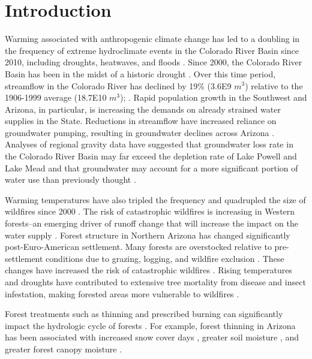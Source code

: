 \documentclass[
  number,
  preprint,
  3p,
  onecolumn]{elsarticle}
\begin{document}
\section{Introduction}\label{introduction}

Warming associated with anthropogenic climate change has led to a
doubling in the frequency of extreme hydroclimate events in the Colorado
River Basin since 2010, including droughts, heatwaves, and floods
\citep{bennett_concurrent_2021}. Since 2000, the Colorado River Basin
has been in the midst of a historic drought
\citep{meko_treering_2022, williams_rapid_2022}. Over this time period,
streamflow in the Colorado River has declined by 19\% (3.6E9 \(m^3\))
relative to the 1906-1999 average (18.7E10 \(m^3\));
\citep{hogan_recent_2024, udall_twentyfirst_2017}. Rapid population
growth in the Southwest and Arizona, in particular, is increasing the
demands on already strained water supplies in the State. Reductions in
streamflow have increased reliance on groundwater pumping, resulting in
groundwater declines across Arizona \citep{tadych_historical_2024}.
Analyses of regional gravity data have suggested that groundwater loss
rate in the Colorado River Basin may far exceed the depletion rate of
Lake Powell and Lake Mead and that groundwater may account for a more
significant portion of water use than previously thought
\citep{castle2014}.

Warming temperatures have also tripled the frequency and quadrupled the
size of wildfires since 2000 \citep{iglesias2022}. The risk of
catastrophic wildfires is increasing in Western forests--an emerging
driver of runoff change that will increase the impact on the water
supply \citep{williams_rapid_2022}. Forest structure in Northern Arizona
has changed significantly post-Euro-American settlement. Many forests
are overstocked relative to pre-settlement conditions due to grazing,
logging, and wildfire exclusion
\citep{covington_southwestern_1994, friederici2013}. These changes have
increased the risk of catastrophic wildfires \citep{allen2002}. Rising
temperatures and droughts have contributed to extensive tree mortality
from disease and insect infestation, making forested areas more
vulnerable to wildfires \citep{berner_tree_2017}.

Forest treatments such as thinning and prescribed burning can
significantly impact the hydrologic cycle of forests
\citep{del_campo_global_2022}. For example, forest thinning in Arizona
has been associated with increased snow cover days
\citep{sankey_multi-scale_2015, belmonte2021, donager_integrating_2021},
greater soil moisture \citep{belmonte_soil_2022, sankey_thinning_2022},
and greater forest canopy moisture \citep{sankey_regionalscale_2021}.
\end{document}
